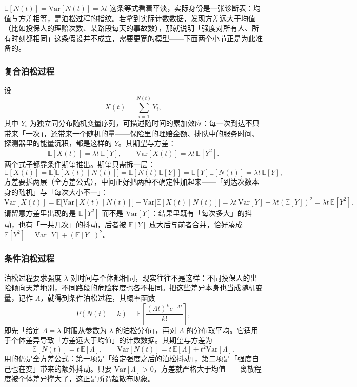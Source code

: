 \documentclass[UTF8]{ctexbook}
\begin{document}
$\mathbb{E}[N(t)]=\mathrm{Var}[N(t)]=\lambda t$ 这条等式看着平淡，实际身份是一张诊断表：均值与方差相等，是泊松过程的指纹。若拿到实际计数数据，发现方差远大于均值（比如投保人的理赔次数、某路段每天的事故数），那就说明「强度对所有人、所有时刻都相同」这条假设并不成立，需要更宽的模型——下面两个小节正是为此准备的。

\subsubsection{复合泊松过程}

设
\[
X(t)=\sum_{i=1}^{N(t)}Y_i,
\]
其中 $Y_i$ 为独立同分布随机变量序列，可描述随时间的累加效应：每一次到达不只带来「一次」，还带来一个随机的量——保险里的理赔金额、排队中的服务时间、探测器里的能量沉积，都是这样的 $Y$。其期望与方差：
\[
\mathbb{E}[X(t)]=\lambda t\,\mathbb{E}[Y],\qquad \mathrm{Var}[X(t)]=\lambda t\,\mathbb{E}[Y^2].
\]
两个式子都靠条件期望推出。期望只需拆一层：
\[
\mathbb{E}[X(t)]=\mathbb{E}\bigl[\mathbb{E}[X(t)\mid N(t)]\bigr]
=\mathbb{E}[N(t)\mathbb{E}[Y]]
=\mathbb{E}[Y]\mathbb{E}[N(t)]
=\lambda t\,\mathbb{E}[Y],
\]
方差要拆两层（全方差公式），中间正好把两种不确定性加起来——「到达次数本身的随机」与「每次大小不一」：
\[
\mathrm{Var}[X(t)]
=\mathbb{E}\bigl[\mathrm{Var}[X(t)\mid N(t)]\bigr]
+\mathrm{Var}\bigl[\mathbb{E}[X(t)\mid N(t)]\bigr]
=\lambda t\,\mathrm{Var}[Y]+\lambda t(\mathbb{E}[Y])^2
=\lambda t\,\mathbb{E}[Y^2].
\]
请留意方差里出现的是 $\mathbb{E}[Y^2]$ 而不是 $\mathrm{Var}[Y]$：结果里既有「每次多大」的抖动，也有「一共几次」的抖动，后者被 $\mathbb{E}[Y]$ 放大后与前者合并，恰好凑成 $\mathbb{E}[Y^2]=\mathrm{Var}[Y]+(\mathbb{E}[Y])^2$。

\subsubsection{条件泊松过程}

泊松过程要求强度 $\lambda$ 对时间与个体都相同，现实往往不是这样：不同投保人的出险倾向天差地别，不同路段的危险程度也各不相同。把这些差异本身也当成随机变量，记作 $\Lambda$，就得到条件泊松过程，其概率函数
\[
P(N(t)=k)=\mathbb{E}\!\left[\frac{(\Lambda t)^k e^{-\Lambda t}}{k!}\right],
\]
即先「给定 $\Lambda=\lambda$ 时服从参数为 $\lambda$ 的泊松分布」，再对 $\Lambda$ 的分布取平均。它适用于个体差异导致「方差远大于均值」的计数数据。其期望与方差为
\[
\mathbb{E}[N(t)]=t\,\mathbb{E}[\Lambda],\qquad
\mathrm{Var}[N(t)]=t\,\mathbb{E}[\Lambda]+t^2\mathrm{Var}[\Lambda].
\]
用的仍是全方差公式：第一项是「给定强度之后的泊松抖动」，第二项是「强度自己也在变」带来的额外抖动。只要 $\mathrm{Var}[\Lambda]>0$，方差就严格大于均值——离散程度被个体差异撑大了，这正是所谓超散布现象。
\end{document}
